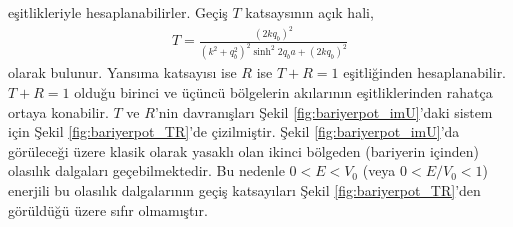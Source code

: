 \documentclass[a4paper,12pt, twoside]{article}
\begin{document}
eşitlikleriyle hesaplanabilirler. Geçiş $T$ katsaysının açık hali,
\begin{align}
T=\frac{(2 k q_b)^{2}}{\left(k^{2}+q_b^{2}\right)^{2} \sinh ^{2} 2 q_b a+(2 k q_b)^{2}}
\label{eq:bariyerpot_T}
\end{align}
olarak bulunur. Yansıma katsayısı ise $R$ ise  $T+R = 1$ eşitliğinden hesaplanabilir. $T+R = 1$ olduğu birinci ve üçüncü bölgelerin akılarının eşitliklerinden rahatça ortaya konabilir. $T$ ve $R$'nin davranışları Şekil \ref{fig:bariyerpot_imU}'daki sistem için Şekil \ref{fig:bariyerpot_TR}'de çizilmiştir. Şekil \ref{fig:bariyerpot_imU}'da görüleceği üzere klasik olarak yasaklı olan ikinci bölgeden (bariyerin içinden) olasılık dalgaları geçebilmektedir. Bu nedenle $0<E<V_0$ (veya  $0<E/V_0<1$) enerjili bu olasılık dalgalarının geçiş katsayıları Şekil \ref{fig:bariyerpot_TR}'den görüldüğü üzere sıfır olmamıştır.
\end{document}
